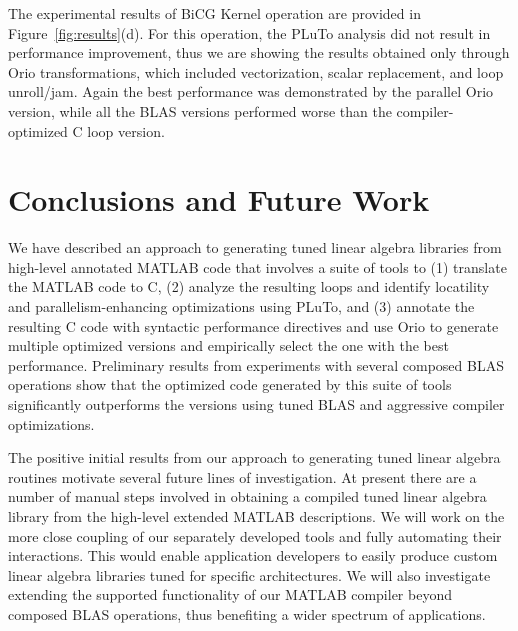 \documentclass[runningheads]{llncs}
\begin{document}
The experimental results of BiCG Kernel operation are provided in
Figure~\ref{fig:results}(d). For this operation, the PLuTo analysis
did not result in performance improvement, thus we are showing the
results obtained only through Orio transformations, which included
vectorization, scalar replacement, and loop unroll/jam. Again the best
performance was demonstrated by the parallel Orio version, while all
the BLAS versions performed worse than the compiler-optimized C loop
version.

\section{Conclusions and Future Work}

We have described an approach to generating tuned linear algebra libraries
from high-level annotated MATLAB code that involves a suite of tools to (1)
translate the MATLAB code to C, (2) analyze the resulting loops and identify
locatility and parallelism-enhancing optimizations using PLuTo, and (3)
annotate the resulting C code with syntactic performance directives and use
Orio to generate multiple optimized versions and empirically select the one
with the best performance. Preliminary results from experiments with several
composed BLAS operations show that the optimized code generated by this suite
of tools significantly outperforms the versions using tuned BLAS and
aggressive compiler optimizations.

The positive initial results from our approach to generating tuned linear
algebra routines motivate several future lines of investigation. At present
there are a number of manual steps involved in obtaining a compiled tuned
linear algebra library from the high-level extended MATLAB descriptions. We
will work on the more close coupling of our separately developed tools and
fully automating their interactions. This would enable application developers
to easily produce custom linear algebra libraries tuned for specific
architectures. We will also investigate extending the supported functionality
of our MATLAB compiler beyond composed BLAS operations, thus benefiting a
wider spectrum of applications.
\end{document}
